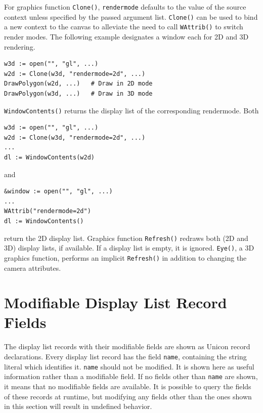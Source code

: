 \documentclass[letterpaper,12pt]{article}
\begin{document}
For graphics function \texttt{Clone()}, \texttt{rendermode} defaults to the 
value of the source context unless specified by the passed argument list. 
\texttt{Clone()} can be used to bind a new context to the canvas to alleviate 
the need to call \texttt{WAttrib()} to switch render modes. The following
example designates a window each for 2D and 3D rendering.

\begin{verbatim}
w3d := open("", "gl", ...)
w2d := Clone(w3d, "rendermode=2d", ...)
DrawPolygon(w2d, ...)	# Draw in 2D mode
DrawPolygon(w3d, ...)   # Draw in 3D mode
\end{verbatim}

\noindent
\texttt{WindowContents()} returns the display list of the corresponding
rendermode. Both

\begin{verbatim}
w3d := open("", "gl", ...)
w2d := Clone(w3d, "rendermode=2d", ...)
...
dl := WindowContents(w2d)
\end{verbatim}

\noindent and

\begin{verbatim}
&window := open("", "gl", ...)
...
WAttrib("rendermode=2d")
dl := WindowContents()
\end{verbatim}

\noindent return the 2D display list. 
Graphics function \texttt{Refresh()} redraws both (2D and 3D) display lists,
if available. If a display list is empty, it is ignored. \texttt{Eye()},
a 3D graphics function, performs an implicit \texttt{Refresh()} in addition to 
changing the camera attributes.

\newpage
\section{Modifiable Display List Record Fields}

The display list records with their modifiable fields are shown as Unicon
record declarations. 
Every display list record has the field \texttt{name}, containing the string
literal which identifies it. \texttt{name} should not be modified.
It is shown here as useful information rather than a modifiable
field. If no fields other than \texttt{name} are shown, it means that no 
modifiable
fields are available. It is possible to query the fields of these records at
runtime, but modifying any fields other than the ones shown in this section
will result in undefined behavior.
\end{document}
